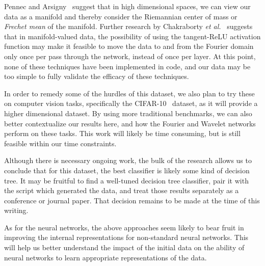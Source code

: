 \documentclass[10pt]{article}
\begin{document}
Pennec and Arsigny~\cite{pennec2013information} suggest that in high dimensional spaces, we can view our data as a manifold and thereby consider the Riemannian center of mass or \textit{Frechet mean} of the manifold.
Further research by Chakraborty \textit{et al.}~\cite{chakraborty2019surreal} suggests that in manifold-valued data, the possibility of using the tangent-ReLU activation function may make it feasible to move the data to and from the Fourier domain only once per pass through the network, instead of once per layer.
At this point, none of these techniques have been implemented in code, and our data may be too simple to fully validate the efficacy of these techniques.

In order to remedy some of the hurdles of this dataset, we also plan to try these on computer vision tasks, specifically the CIFAR-10~\cite{krizhevsky2009learning} dataset, as it will provide a higher dimensional dataset. 
By using more traditional benchmarks, we can also better contextualize our results here, and how the Fourier and Wavelet networks perform on these tasks.
This work will likely be time consuming, but is still feasible within our time constraints.

Although there is necessary ongoing work, the bulk of the research allows us to conclude that for this dataset, the best classifier is likely some kind of decision tree.
It may be fruitful to find a well-tuned decision tree classifier, pair it with the script which generated the data, and treat those results separately as a conference or journal paper. 
That decision remains to be made at the time of this writing.

As for the neural networks, the above approaches seem likely to bear fruit in improving the internal representations for non-standard neural networks.
This will help us better understand the impact of the initial data on the ability of neural networks to learn appropriate representations of the data.





\end{document}
